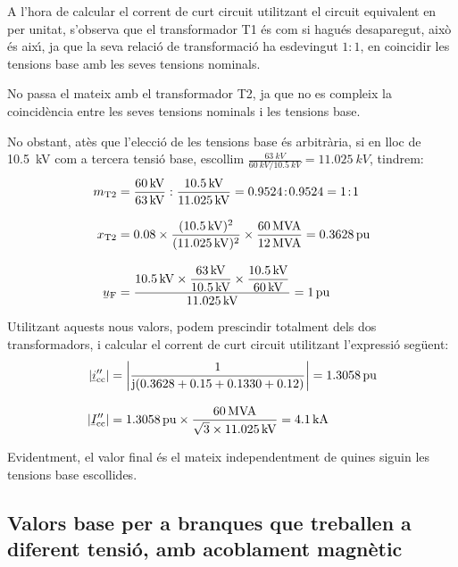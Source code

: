 \begin{exemple}
 A l'hora de calcular el corrent de curt circuit utilitzant el circuit equivalent en per unitat,
 s'observa que el transformador T1 \'{e}s com si hagu\'{e}s desaparegut,
 aix\`{o} \'{e}s aix\'{\i}, ja que la seva relaci\'{o} de transformaci\'{o} ha esdevingut
 $1\!:\!1$, en coincidir les tensions base amb les seves tensions nominals.

 No passa el mateix amb el transformador T2, ja que no es compleix
 la coincid\`{e}ncia entre les seves tensions nominals i les tensions
 base.

 No obstant, at\`{e}s que l'elecci\'{o} de les tensions base \'{e}s
 arbitr\`{a}ria, si en lloc de \SI{10,5}{kV} com a tercera tensi\'{o} base,
 escollim
 $\frac{\SI{63}{kV}}{\SI{60}{kV} / \SI{10,5}{kV}}=\SI{11,025}{kV}$,
 tindrem:
\begin{align*}
   m\ped{T2} &= \frac{60\unit{kV}}{63\unit{kV}} : \frac{\SI{10,5}{kV}}{\SI{11,025}{kV}}
   = \num{0,9524}\!:\!\num{0,9524} = 1\!:\!1 \\[3mm]
   x\ped{T2} &= \num{0,08} \times \frac{(\SI{10,5}{kV})^2}{(\SI{11,025}{kV})^2 } \times
   \frac{60\unit{MVA}}{12\unit{MVA}}  = \SI{0,3628}{pu}\\[3mm]
   \cmplx{u}\ped{F} &= \frac{\SI{10,5}{kV} \times \dfrac{63\unit{kV}}{\SI{10,5}{kV}} \times
   \dfrac{\SI{10,5}{kV}}{60\unit{kV}}}{\SI{11,025}{kV}} = 1\unit{pu}
\end{align*}

Utilitzant aquests nous valors, podem prescindir totalment dels dos
transformadors, i calcular el corrent de curt circuit utilitzant
l'expressi\'{o} seg\"{u}ent:
\begin{align*}
|\cmplx{i}''\ped{cc}| &= \left| \frac{1}{\ju ( \num{0,3628} + \num{0,15} +
\num{0,1330} + \num{0,12} )} \right| = \SI{1,3058}{pu} \\[3mm]
|\cmplx{I}''\ped{cc}| &=
\SI{1,3058}{pu}\times\frac{60\unit{MVA}}{\sqrt{3}\times \SI{11,025}{kV}} =
\SI{4,1}{kA}
\end{align*}

Evidentment, el valor final \'{e}s el mateix independentment de quines
siguin les tensions base escollides.
\end{exemple}

\subsection{Valors base per a branques que treballen a diferent tensi\'{o}, amb acoblament magn\`{e}tic}

